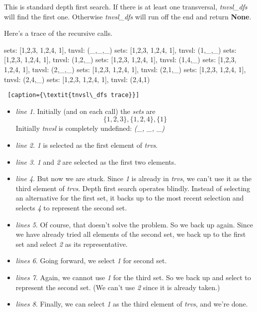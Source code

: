 This is standard depth first search. If there is at least one transversal, \textit{tnvsl\_dfs} will find the first one. Otherwise \textit{tnvsl\_dfs} will run off the end and return \textbf{None}.

Here's a trace of the recursive calls.

\smallv
\begin{minipage}[c]{0.45\textwidth}
\begin{python1}  
sets: [{1,2,3}, {1,2,4}, {1}], tnvsl: (_,_,_)
  sets: [{1,2,3}, {1,2,4}, {1}], tnvsl: (1,_,_)
    sets: [{1,2,3}, {1,2,4}, {1}], tnvsl: (1,2,_)
    sets: [{1,2,3}, {1,2,4}, {1}], tnvsl: (1,4,_)
  sets: [{1,2,3}, {1,2,4}, {1}], tnvsl: (2,_,_)
    sets: [{1,2,3}, {1,2,4}, {1}], tnvsl: (2,1,_)
    sets: [{1,2,3}, {1,2,4}, {1}], tnvsl: (2,4,_)
      sets: [{1,2,3}, {1,2,4}, {1}], tnvsl: (2,4,1)
\end{python1}\linv
\begin{lstlisting} [caption={\textit{tnvsl\_dfs trace}}]
\end{lstlisting}
\end{minipage}

\begin{itemize}
    \item \textit{line 1}. Initially (and on each call) the \textit{sets} are \[\{1, 2, 3\}, \{1, 2, 4\}, \{1\}\] Initially \textit{tnvsl} is completely undefined: \textit{(\_, \_, \_)}
    \item  \textit{line 2}. \textit{1} is selected as the first element of \textit{trvs}.
    \item  \textit{line 3}. \textit{1}  and \textit{2} are selected as the first two elements.
    \item \textit{line 4}. But now we are stuck. Since \textit{1} is already in \textit{trvs}, we can't use it as the third element of \textit{trvs}. Depth first search operates blindly. Instead of selecting an alternative for the first set, it backs up to the most recent selection and selects \textit{4} to represent the second set. 
    \item \textit{lines 5}. Of course, that doesn't solve the problem. So we back up again. Since we have already tried all elements of the second set, we back up to the first set and select \textit{2} as its representative. 
    \item \textit{lines 6}. Going forward, we select \textit{1} for second set.
    \item \textit{lines 7}. Again, we cannot use \textit{1} for the third set. So we back up and select  to represent the second set. (We can't use \textit{2} since it is already taken.)
    \item \textit{lines 8}. Finally, we can select \textit{1} as the third element of \textit{trvs}, and we're done.
\end{itemize}

